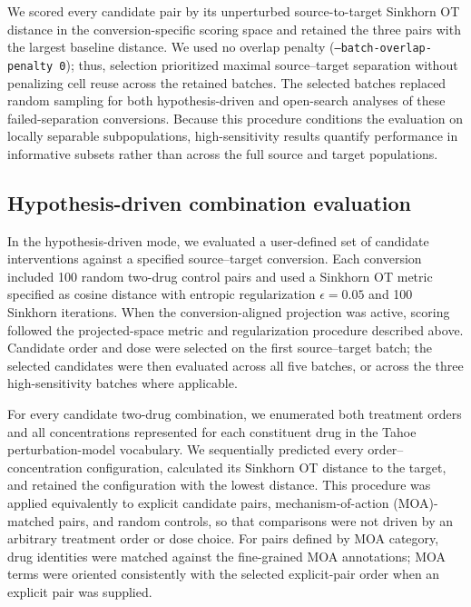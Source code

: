 \documentclass[11pt,a4paper]{article}
\begin{document}
We scored every candidate pair by its unperturbed source-to-target Sinkhorn OT distance in the conversion-specific scoring space and retained the three pairs with the largest baseline distance. We used no overlap penalty (\texttt{--batch-overlap-penalty 0}); thus, selection prioritized maximal source--target separation without penalizing cell reuse across the retained batches. The selected batches replaced random sampling for both hypothesis-driven and open-search analyses of these failed-separation conversions. Because this procedure conditions the evaluation on locally separable subpopulations, high-sensitivity results quantify performance in informative subsets rather than across the full source and target populations.

\subsection{Hypothesis-driven combination evaluation}
In the hypothesis-driven mode, we evaluated a user-defined set of candidate interventions against a specified source--target conversion. Each conversion included 100 random two-drug control pairs and used a Sinkhorn OT metric specified as cosine distance with entropic regularization $\epsilon=0.05$ and 100 Sinkhorn iterations. When the conversion-aligned projection was active, scoring followed the projected-space metric and regularization procedure described above. Candidate order and dose were selected on the first source--target batch; the selected candidates were then evaluated across all five batches, or across the three high-sensitivity batches where applicable.

For every candidate two-drug combination, we enumerated both treatment orders and all concentrations represented for each constituent drug in the Tahoe perturbation-model vocabulary. We sequentially predicted every order--concentration configuration, calculated its Sinkhorn OT distance to the target, and retained the configuration with the lowest distance. This procedure was applied equivalently to explicit candidate pairs, mechanism-of-action (MOA)-matched pairs, and random controls, so that comparisons were not driven by an arbitrary treatment order or dose choice. For pairs defined by MOA category, drug identities were matched against the fine-grained MOA annotations; MOA terms were oriented consistently with the selected explicit-pair order when an explicit pair was supplied.
\end{document}
